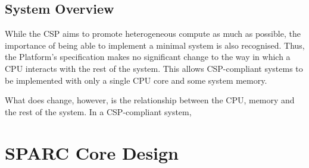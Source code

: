 \documentclass[12pt]{report}
\begin{document}
\section{System Overview}
While the CSP aims to promote heterogeneous compute as much as possible, the importance of being able
to implement a minimal system is also recognised. Thus, the Platform's specification makes no significant change to the
way in which a CPU interacts with the rest of the system. This allows CSP-compliant systems to be implemented with only
a single CPU core and some system memory.

What does change, however, is the relationship between the CPU, memory and the rest of the system. In a CSP-compliant
system,

\chapter{SPARC Core Design}
\end{document}
